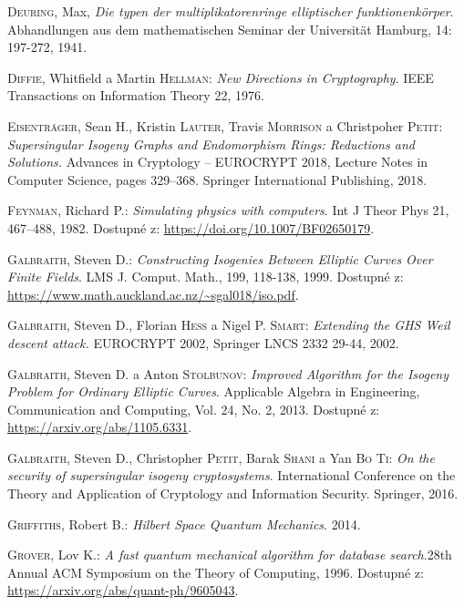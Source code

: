 \documentclass[12pt]{report}
\begin{document}
\begin{thebibliography}{97}
\textsc{Deuring}, Max, \textit{Die typen der multiplikatorenringe elliptischer funktionenkörper}. Abhandlungen aus dem mathematischen Seminar der Universität Hamburg, 14: 197-272, 1941. 

\textsc{Diffie}, Whitfield a Martin \textsc{Hellman}: \textit{New Directions in Cryptography}. IEEE Transactions on Information Theory 22, 1976.

\textsc{Eisentr{\"a}ger}, Sean H., Kristin \textsc{Lauter}, Travis \textsc{Morrison} a Christpoher \textsc{Petit}: \textit{Supersingular Isogeny Graphs and Endomorphism Rings: Reductions and Solutions.}
Advances in Cryptology – EUROCRYPT 2018, Lecture Notes in Computer Science, pages 329–368. Springer International Publishing, 2018.

\textsc{Feynman}, Richard P.: \textit{Simulating physics with computers}. Int J Theor Phys 21, 467–488, 1982. Dostupné z: \url{https://doi.org/10.1007/BF02650179}.

\textsc{Galbraith}, Steven D.: \textit{Constructing Isogenies Between Elliptic Curves Over Finite Fields}. LMS J. Comput. Math., 199, 118-138, 1999. Dostupné z: \url{https://www.math.auckland.ac.nz/~sgal018/iso.pdf}.

\textsc{Galbraith}, Steven D., Florian \textsc{Hess} a Nigel P. \textsc{Smart}: \textit{Extending the GHS Weil descent attack.} EUROCRYPT 2002,  Springer LNCS 2332 29-44, 2002.

\textsc{Galbraith}, Steven D. a Anton \textsc{Stolbunov}: \textit{Improved Algorithm for the Isogeny Problem for Ordinary Elliptic Curves}. Applicable Algebra in Engineering, Communication and Computing, Vol. 24, No. 2, 2013. Dostupné z: \url{https://arxiv.org/abs/1105.6331}.

\textsc{Galbraith}, Steven D., Christopher \textsc{Petit}, Barak \textsc{Shani} a Yan \textsc{Bo Ti}: \textit{On the security of supersingular isogeny cryptosystems}. International Conference on the Theory and Application of Cryptology and Information Security. Springer, 2016.

\textsc{Griffiths}, Robert B.: \textit{Hilbert Space Quantum Mechanics}. 2014.

\textsc{Grover}, Lov K.: \textit{A fast quantum mechanical algorithm for database search}.28th Annual ACM Symposium on the Theory of Computing, 1996. Dostupné z: \url{https://arxiv.org/abs/quant-ph/9605043}.


\end{thebibliography}
\end{document}
